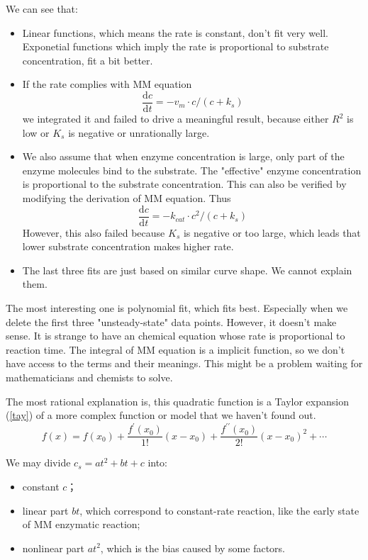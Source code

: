 We can see that:
\begin{itemize}
	\item
	Linear functions, which means the rate is constant, don't fit very
	well. Exponetial functions which imply the rate is proportional to
	substrate concentration, fit a bit better.
	\item
	If the rate complies with MM equation
	\[\dfrac{\mathrm{d}c}{\mathrm{d}t}=-v_m\cdot c/(c+k_s)\]
	we integrated it and failed to drive a meaningful result, because
	either \(R^2\) is low or \(K_s\) is negative or unrationally large.
	\item
	We also assume that when enzyme concentration is large, only part of
	the enzyme molecules bind to the substrate. The "effective" enzyme
	concentration is proportional to the substrate concentration. This can
	also be verified by modifying the derivation of MM equation. Thus
	\[\dfrac{\mathrm{d}c}{\mathrm{d}t}=-k_{cat}\cdot c^2/(c+k_s)\]
	However, this also failed because \(K_s\) is negative or too large,
	which leads that lower substrate concentration makes higher rate.
	\item
	The last three fits are just based on similar curve shape. We cannot
	explain them.
\end{itemize}

The most interesting one is polynomial fit, which fits best.
Especially when we delete the first three "unsteady-state" data points. However, it doesn't make sense. It is strange to have an chemical equation whose rate is proportional to reaction time. The integral of MM equation is a implicit function, so we don't have access to the terms and their meanings. This might be a problem waiting for mathematicians and chemists to solve.

The most rational explanation is, this quadratic function is a Taylor expansion (\eqref{tay}) of a more complex function or model that we haven't found out. 
\begin{equation}
	f(x)=f(x_0)+\dfrac{f^{\prime}(x_0)}{1!}(x-x_0)+\dfrac{f^{\prime \prime}(x_0)}{2!}(x-x_0)^2+\cdots \label{tay}
\end{equation}

We may divide $c_s=at^2+bt+c$ into:
\begin{itemize}
	\item constant $c$；
	\item linear part $bt$, which correspond to constant-rate reaction, like the early state of MM enzymatic reaction;
	\item nonlinear part $at^2$, which is the bias caused by some factors.
\end{itemize}

